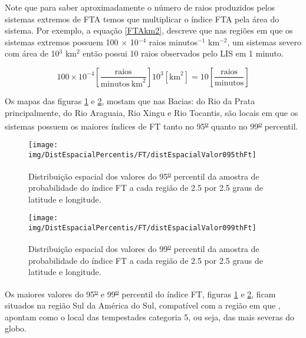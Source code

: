 Note que para saber aproximadamente o número de raios produzidos pelos sistemas extremos de FTA temos que multiplicar o índice FTA pela área do sistema. Por exemplo, a equação \ref{FTAkm2}, descreve que nas regiões em que os sistemas extremos possuem 100 $\times$ 10$^{-4}$ raios minutos$^{-1}$ km$^{-2}$, um sistemas severo com área de 10$^3$ km$^2$ então possui 10 raios observados pelo LIS em 1 minuto.  

\begin{equation}
100 \times 10^{-4} \left[ \frac{\mathrm{raios}}{\mathrm{minutos}~\mathrm{km}^2} \right]  10^3 [ \mathrm{km}^2 ] = 10 \left[ \frac{\mathrm{raios}}{\mathrm{minutos}}\right]  
\label{FTAkm2}
\end{equation}

Os mapas das figuras \ref{95oFt} e \ref{99oFt}, mostam que nas Bacias: do Rio da Prata principalmente, do Rio Araguaia, Rio Xingu e Rio Tocantis, são locais em que os sistemas possuem os maiores índices de FT tanto no 95\textsuperscript{\underline{o}} quanto no 99\textsuperscript{\underline{o}} percentil.

\begin{figure}[!ht]
\centering
{\texttt{[image: img/DistEspacialPercentis/FT/distEspacialValor095thFt]}} 
\caption{Distribuição espacial dos valores do 95\textsuperscript{\underline{o}} percentil da amostra de probabilidade do índice FT a cada região de 2.5 por 2.5 graus de latitude e longitude.}
\label{95oFt}
\end{figure} 
  
\begin{figure}[!ht]
\centering  
{\texttt{[image: img/DistEspacialPercentis/FT/distEspacialValor099thFt]}}
\caption{Distribuição espacial dos valores do  99\textsuperscript{\underline{o}} percentil da amostra de probabilidade do índice FT a cada região de 2.5 por 2.5 graus de latitude e longitude.}
\label{99oFt}
\end{figure}

Os maiores valores do 95\textsuperscript{\underline{o}} e 99\textsuperscript{\underline{o}} percentil do índice FT, figuras \ref{95oFt} e \ref{99oFt},  ficam situados na região Sul da América do Sul, compatível com a região em que , apontam como o local das tempestades categoria 5, ou seja, das mais severas do globo.